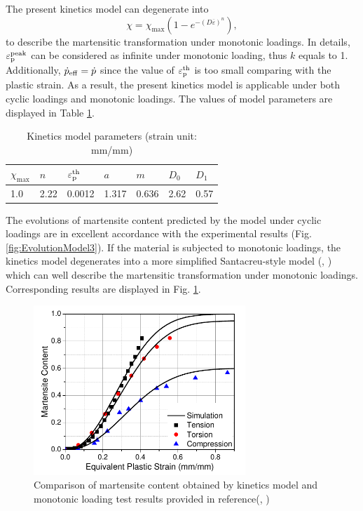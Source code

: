 \documentclass[final,5p,times,onecolumn,10pt,sort&compress]{elsarticle}
\begin{document}
The present kinetics model can degenerate into
\begin{equation}
\chi=\chi_{\max }\left(1-e^{-(D \overline{\varepsilon})^{n}}\right),
\end{equation}to describe the martensitic transformation under monotonic loadings. In details, $\varepsilon_{\rm p}^{\rm peak}$ can be considered as infinite under monotonic loading, thus $k$ equals to 1. Additionally, $\dot{p}_{\rm eff}=\dot{p}$ since the value of $\varepsilon_{\rm p}^{\rm th}$ is too small comparing with the plastic strain. As a result, the present kinetics model is applicable under both cyclic loadings and monotonic loadings. The values of model parameters are displayed in Table \ref{tab:Kinetics Model Parameters}.


\begin{table}[ht]
\centering
\caption{Kinetics model parameters (strain unit: mm/mm)}
\begin{tabular}{lllllll}
\hline
$\chi_{\max}$  &$n$       &$\varepsilon_{\rm p}^{\rm th}$ & $a$        & $m$        & $D_{0}$ & $D_{1}$ \\ \hline
1.0                 &2.22  &0.0012                            & 1.317 & 0.636  & 2.62        & 0.57  \\ \hline
\end{tabular}
\label{tab:Kinetics Model Parameters}
\end{table}


The evolutions of martensite content predicted by the model under cyclic loadings are in excellent accordance with the experimental results  (Fig. \ref{fig:EvolutionModel3}). If the material is subjected to monotonic loadings, the kinetics model degenerates into a more simplified Santacreu-style model (\citeauthor{QSP2014}, \citeyear{QSP2014}) which can well describe the martensitic transformation under monotonic loadings. Corresponding results are displayed in Fig. \ref{fig:EvolutionModel3formonotonic}.


\begin{figure}[ht]
  \begin{center}
  \includegraphics[width=8cm]{QinResult.pdf}
  \caption{Comparison of martensite content obtained by kinetics model and monotonic loading test results provided in reference(\citeauthor{QSP2014}, \citeyear{QSP2014})}
  \label{fig:EvolutionModel3formonotonic}
  \end{center}
\end{figure}
\end{document}
